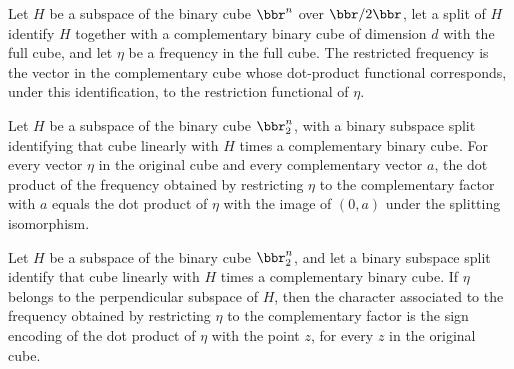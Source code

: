 \begin{definition}
\label{FABL.BinarySubspaceSplit.restrictFrequency}
\leanok
{}
Let $H$ be a subspace of the binary cube $\bbr^n$ over $\bbr/2\bbr$, let a split of $H$
identify $H$ together with a complementary binary cube of dimension $d$ with the full
cube, and let $\eta$ be a frequency in the full cube. The restricted frequency is
the vector in the complementary cube whose dot-product functional corresponds, under
this identification, to the restriction functional of $\eta$.
\end{definition}

\begin{theorem}
\label{FABL.BinarySubspaceSplit.dotProduct_restrictFrequency}
\leanok
{}
Let $H$ be a subspace of the binary cube $\bbr_2^n$, with a binary subspace split
identifying that cube linearly with $H$ times a complementary binary cube. For every
vector $\eta$ in the original cube and every complementary vector $a$, the dot product
of the frequency obtained by restricting $\eta$ to the complementary factor with $a$
equals the dot product of $\eta$ with the image of $(0,a)$ under the splitting
isomorphism.
\end{theorem}

\begin{theorem}
\label{FABL.BinarySubspaceSplit.character_restrictFrequency}
\leanok
{}
Let $H$ be a subspace of the binary cube $\bbr_2^n$, and let a binary subspace split
identify that cube linearly with $H$ times a complementary binary cube. If $\eta$
belongs to the perpendicular subspace of $H$, then the character associated to the
frequency obtained by restricting $\eta$ to the complementary factor is the sign
encoding of the dot product of $\eta$ with the point $z$, for every $z$ in the original
cube.
\end{theorem}

